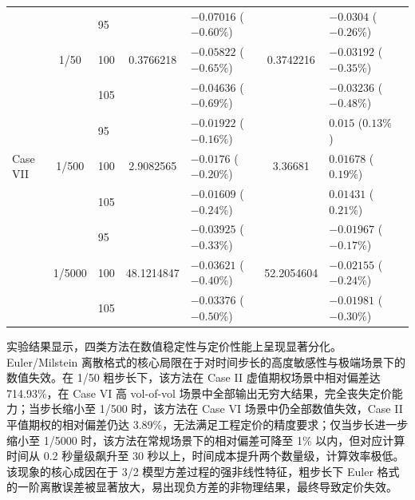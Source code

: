 \begin{table}[htbp]
{\begin{tabular}{lclclclc}
    \midrule
    \multirow{9}{*}{Case VII}
    & \multirow{3}{*}{1/50}  & 95  & \multirow{3}{*}{0.3766218}  & $-0.07016$ ($-0.60\%$)   & \multirow{3}{*}{0.3742216} & $-0.0304$ ($-0.26\%$)     \\
    &                         & 100 &                           & $-0.05822$ ($-0.65\%$)     &                           & $-0.03192$ ($-0.35\%$)   \\
    &                         & 105 &                           & $-0.04636$ ($-0.69\%$)    &                           & $-0.03236$ ($-0.48\%$)     \\
    \cmidrule(lr){2-7}
    & \multirow{3}{*}{1/500} & 95 & \multirow{3}{*}{2.9082565}  & $-0.01922$ ($-0.16\%$)  & \multirow{3}{*}{3.36681} & $0.015$ ($0.13\%$)   \\
    &                         & 100 &                           & $-0.0176$ ($-0.20\%$)   &                           & $0.01678$ ($0.19\%$)    \\
    &                         & 105  &                           & $-0.01609$ ($-0.24\%$)   &                           & $0.01431$ ($0.21\%$)   \\
    \cmidrule(lr){2-7}
    & \multirow{3}{*}{1/5000}& 95 & \multirow{3}{*}{48.1214847}& $-0.03925$ ($-0.33\%$)  & \multirow{3}{*}{52.2054604} & $-0.01967$ ($-0.17\%$)   \\
    &                         & 100 &                           & $-0.03621$ ($-0.40\%$)   &                           & $-0.02155$ ($-0.24\%$)    \\
    &                         & 105  &                           & $-0.03376$ ($-0.50\%$)    &                           & $-0.01981$ ($-0.30\%$)   \\
    \bottomrule
  \end{tabular}%
  }
\end{table}
实验结果显示，四类方法在数值稳定性与定价性能上呈现显著分化。Euler/Milstein 离散格式的核心局限在于对时间步长的高度敏感性与极端场景下的数值失效。在 1/50 粗步长下，该方法在 Case II 虚值期权场景中相对偏差达 714.93\%，在 Case VI 高 vol-of-vol 场景中全部输出无穷大结果，完全丧失定价能力；当步长缩小至 1/500 时，该方法在 Case VI 场景中仍全部数值失效，Case II 平值期权的相对偏差仍达 3.89\%，无法满足工程定价的精度要求；仅当步长进一步缩小至 1/5000 时，该方法在常规场景下的相对偏差可降至 1\% 以内，但对应计算时间从 0.2 秒量级飙升至 30 秒以上，时间成本提升两个数量级，计算效率极低。该现象的核心成因在于 3/2 模型方差过程的强非线性特征，粗步长下 Euler 格式的一阶离散误差被显著放大，易出现负方差的非物理结果，最终导致定价失效。
